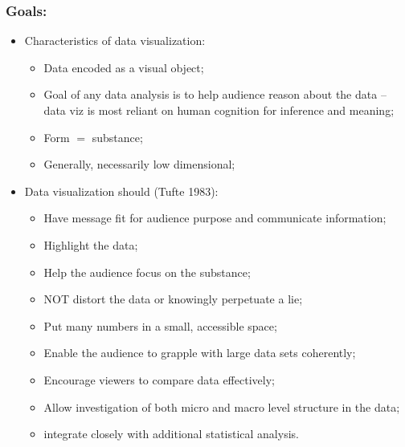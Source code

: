 \documentclass[aspectratio=169]{beamer}
\theoremstyle{principle}
\begin{document}
\begin{frame}
\frametitle{Goals:}
\begin{itemize}
\item Characteristics of data visualization:
\begin{itemize}
\item Data encoded as a visual object;
\item Goal of any data analysis is to help audience reason about the data -- data viz is most reliant on human cognition for inference and meaning;
\item Form $=$ substance;
\item Generally, necessarily low dimensional;
\end{itemize}
\bigskip
\item Data visualization should (Tufte 1983):
\begin{itemize}
\item Have message fit for audience purpose and communicate information;
\item Highlight the data;
\item Help the audience focus on the substance;
\item NOT distort the data or knowingly perpetuate a lie;
\item Put many numbers in a small, accessible space;
\item Enable the audience to grapple with large data sets coherently;
\item Encourage viewers to compare data effectively;
\item Allow investigation of both micro and macro level structure in the data; 
\item integrate closely with additional statistical analysis.
\end{itemize}
\end{itemize}
\end{frame}
\end{document}

